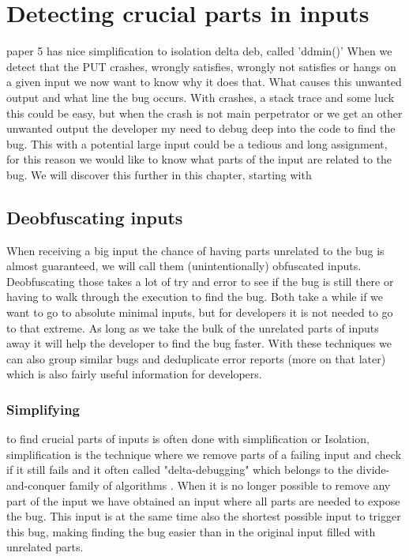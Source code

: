 \chapter{Detecting crucial parts in inputs}
\label{cha:3}
\label{cha:3:intro}
 paper 5 has nice simplification to isolation delta deb, called 'ddmin()'
When we detect that the PUT crashes, wrongly satisfies, wrongly not satisfies or hangs on a given input we now want to know why it does that. What causes this unwanted output and what line the bug occurs. With crashes, a stack trace and some luck this could be easy, but when the crash is not main perpetrator or we get an other unwanted output the developer my need to debug deep into the code to find the bug. This with a potential large input could be a tedious and long assignment, for this reason we would like to know what parts of the input are related to the bug. We will discover this further in this chapter, starting with 

\section{Deobfuscating inputs}
\label{cha:3:Deobfuscating}
When receiving a big input the chance of having parts unrelated to the bug is almost guaranteed, we will call them (unintentionally) obfuscated inputs. Deobfuscating those takes a lot of try and error to see if the bug is still there\cite{bookZellerwhyProgramsFail} or having to walk through the execution to find the bug. Both take a while if we want to go to absolute minimal inputs, but for developers it is not needed to go to that extreme. As long as we take the bulk of the unrelated parts of inputs away it will help the developer to find the bug faster. With these techniques we can also group similar bugs and deduplicate error reports (more on that later) which is also fairly useful information for developers.
\subsection{Simplifying}
\label{cha:3:Simplifying}
to find crucial parts of inputs is often done with simplification or Isolation, simplification is the technique where we remove parts of a failing input and check if it still fails and it often called "delta-debugging"\cite{bookZellerwhyProgramsFail} which belongs to the divide-and-conquer family of algorithms \cite{2FuzzingAndDeltaDebuggingSMTSolvers}. When it is no longer possible to remove any part of the input we have obtained an input where all parts are needed to expose the bug. This input is at the same time also the shortest possible input to trigger this bug, making finding the bug easier than in the original input filled with unrelated parts.
